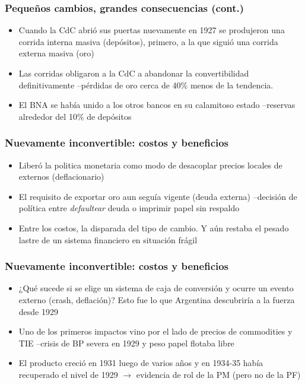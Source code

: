 \documentclass[14pt,aspectratio=169]{beamer}
\begin{document}
\begin{frame}\frametitle{Pequeños cambios, grandes consecuencias (cont.)}
    \begin{itemize}\itemsep 10pt
      \item Cuando la CdC abrió sus puertas nuevamente en 1927 se
        produjeron una corrida interna masiva (depósitos), primero, a la que
        siguió una corrida externa masiva (oro)
        \item Las corridas obligaron a la CdC a abandonar la
          convertibilidad definitivamente --pérdidas de oro cerca de
          40\% menos de la tendencia.
          \item El BNA se había unido a los otros bancos en su
            calamitoso estado --reservas alrededor del 10\% de depósitos
                 \end{itemize}
      \end{frame}



\begin{frame}\frametitle{Nuevamente inconvertible: costos y beneficios}
    \begin{itemize}\itemsep 10pt
      \item Liberó la politica monetaria como modo de desacoplar
        precios locales de externos (deflacionario)
        \item El requisito de exportar oro aun seguía vigente (deuda
          externa) --decisión de política entre \textit{defaultear}
          deuda o imprimir papel sin respaldo
          \item Entre los costos, la disparada del tipo de cambio. Y
            aún restaba el pesado lastre de un sistema financiero en
            situación frágil
                 \end{itemize}
      \end{frame}

      



\begin{frame}\frametitle{Nuevamente inconvertible: costos y beneficios}
    \begin{itemize}\itemsep 10pt
      \item ¿Qué sucede si se elige un sistema de caja de conversión y
        ocurre un evento externo (crash, deflación)? Esto fue lo que
        Argentina descubriría  a la fuerza desde 1929
        \item Uno de los primeros impactos vino por el lado de precios
          de commodities y TIE --crisis de BP severa en 1929 y peso
          papel flotaba libre
          \item El producto creció en 1931 luego de varios años y en
            1934-35 había recuperado el nivel de 1929
            $\longrightarrow$ evidencia de rol de la PM (pero no de la PF)
                 \end{itemize}
      \end{frame}
\end{document}
